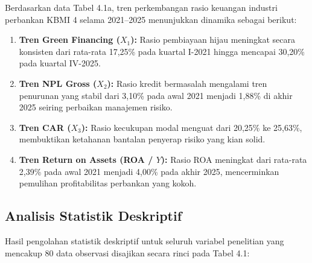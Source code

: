 \documentclass[12pt,a4paper]{article}
\numberwithin{equation}{section}
\begin{document}
\noindent
Berdasarkan data Tabel 4.1a, tren perkembangan rasio keuangan industri perbankan KBMI 4 selama 2021--2025 menunjukkan dinamika sebagai berikut:
\begin{enumerate}
  \item \textbf{Tren Green Financing ($X_1$):} Rasio pembiayaan hijau meningkat secara konsisten dari rata-rata 17,25\% pada kuartal I-2021 hingga mencapai 30,20\% pada kuartal IV-2025.
  \item \textbf{Tren NPL Gross ($X_2$):} Rasio kredit bermasalah mengalami tren penurunan yang stabil dari 3,10\% pada awal 2021 menjadi 1,88\% di akhir 2025 seiring perbaikan manajemen risiko.
  \item \textbf{Tren CAR ($X_3$):} Rasio kecukupan modal menguat dari 20,25\% ke 25,63\%, membuktikan ketahanan bantalan penyerap risiko yang kian solid.
  \item \textbf{Tren Return on Assets (ROA / $Y$):} Rasio ROA meningkat dari rata-rata 2,39\% pada awal 2021 menjadi 4,00\% pada akhir 2025, mencerminkan pemulihan profitabilitas perbankan yang kokoh.
\end{enumerate}

\subsection{Analisis Statistik Deskriptif}

\noindent
Hasil pengolahan statistik deskriptif untuk seluruh variabel penelitian yang mencakup 80 data observasi disajikan secara rinci pada Tabel 4.1:
\end{document}
